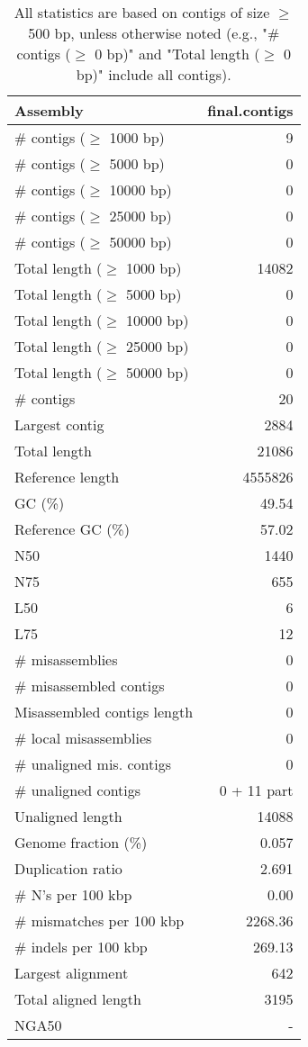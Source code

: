 \documentclass[12pt,a4paper]{article}
\begin{document}
\begin{table}[ht]
\begin{center}
\caption{All statistics are based on contigs of size $\geq$ 500 bp, unless otherwise noted (e.g., "\# contigs ($\geq$ 0 bp)" and "Total length ($\geq$ 0 bp)" include all contigs).}
\begin{tabular}{|l*{1}{|r}|}
\hline
Assembly & final.contigs \\ \hline
\# contigs ($\geq$ 1000 bp) & 9 \\ \hline
\# contigs ($\geq$ 5000 bp) & 0 \\ \hline
\# contigs ($\geq$ 10000 bp) & 0 \\ \hline
\# contigs ($\geq$ 25000 bp) & 0 \\ \hline
\# contigs ($\geq$ 50000 bp) & 0 \\ \hline
Total length ($\geq$ 1000 bp) & 14082 \\ \hline
Total length ($\geq$ 5000 bp) & 0 \\ \hline
Total length ($\geq$ 10000 bp) & 0 \\ \hline
Total length ($\geq$ 25000 bp) & 0 \\ \hline
Total length ($\geq$ 50000 bp) & 0 \\ \hline
\# contigs & 20 \\ \hline
Largest contig & 2884 \\ \hline
Total length & 21086 \\ \hline
Reference length & 4555826 \\ \hline
GC (\%) & 49.54 \\ \hline
Reference GC (\%) & 57.02 \\ \hline
N50 & 1440 \\ \hline
N75 & 655 \\ \hline
L50 & 6 \\ \hline
L75 & 12 \\ \hline
\# misassemblies & 0 \\ \hline
\# misassembled contigs & 0 \\ \hline
Misassembled contigs length & 0 \\ \hline
\# local misassemblies & 0 \\ \hline
\# unaligned mis. contigs & 0 \\ \hline
\# unaligned contigs & 0 + 11 part \\ \hline
Unaligned length & 14088 \\ \hline
Genome fraction (\%) & 0.057 \\ \hline
Duplication ratio & 2.691 \\ \hline
\# N's per 100 kbp & 0.00 \\ \hline
\# mismatches per 100 kbp & 2268.36 \\ \hline
\# indels per 100 kbp & 269.13 \\ \hline
Largest alignment & 642 \\ \hline
Total aligned length & 3195 \\ \hline
NGA50 & - \\ \hline
\end{tabular}
\end{center}
\end{table}
\end{document}
